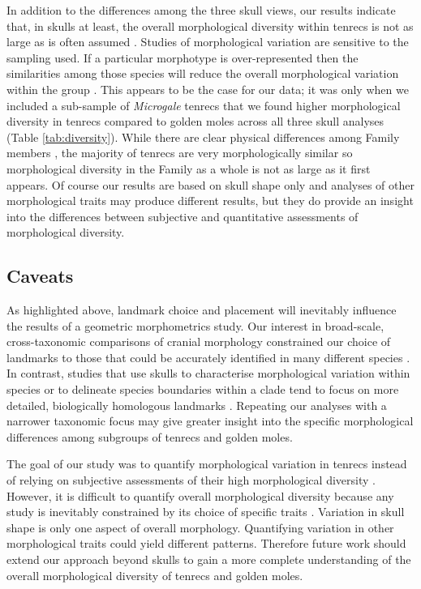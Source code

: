 \documentclass[12pt,a4paper]{article}
\begin{document}
	In addition to the differences among the three skull views, our results indicate that, in skulls at least, the overall morphological diversity within tenrecs is not as large as is often assumed \citep[e.g.][]{Eisenberg1969, Olson2013}. Studies of morphological variation are sensitive to the sampling used. If a particular morphotype is over-represented then the similarities among those species will reduce the overall morphological variation within the group \citep{Foote1991}. This appears to be the case for our data; it was only when we included a sub-sample of \textit{Microgale} tenrecs that we found higher morphological diversity in tenrecs compared to golden moles across all three skull analyses (Table \ref{tab:diversity}).
	While there are clear physical differences among Family members \citep{Olson2013, Eisenberg1969}, the majority of tenrecs are very morphologically similar \citep{Jenkins2003} so morphological diversity in the Family as a whole is not as large as it first appears. Of course our results are based on skull shape only and analyses of other morphological traits may produce different results, but they do provide an insight into the differences between subjective and quantitative assessments of morphological diversity.  
	
	\subsection{Caveats} %
	
	As highlighted above, landmark choice and placement will inevitably influence the results of a geometric morphometrics study. Our interest in broad-scale, cross-taxonomic comparisons of cranial morphology constrained our choice of landmarks to those that could be accurately identified in many different species \citep[e.g.][]{Ruta2013, Goswami2011, Wroe2007}. In contrast, studies that use skulls to characterise morphological variation within species \citep[e.g.][]{Blagojevic2011, Bornholdt2008} or to delineate species boundaries within a clade \citep[e.g.][]{Panchetti2008} tend to focus on more detailed, biologically homologous landmarks \citep{Zelditch2012}. Repeating our analyses with a narrower taxonomic focus may give greater insight into the specific morphological differences among subgroups of tenrecs and golden moles.
		
	The goal of our study was to quantify morphological variation in tenrecs instead of relying on subjective assessments of their high morphological diversity \citep{Olson2013, Soarimalala2011, Eisenberg1969}. However, it is difficult to quantify overall morphological diversity because any study is inevitably constrained by its choice of specific traits \citep{Roy1997}. Variation in skull shape is only one aspect of overall morphology. Quantifying variation in other morphological traits could yield different patterns. Therefore future work should extend our approach beyond skulls to gain a more complete understanding of the overall morphological diversity of tenrecs and golden moles.
\end{document}

